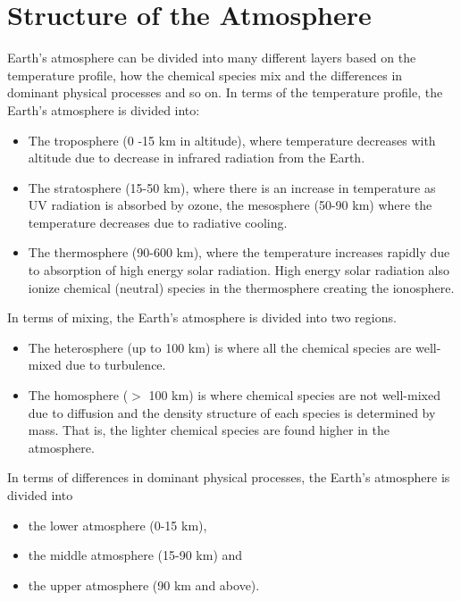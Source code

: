 \section{Structure of the Atmosphere}
\label{sec:str}
Earth’s atmosphere can be divided into many different layers based on the temperature profile, how the chemical species mix and the differences in dominant physical processes and so on. In terms of the temperature profile, the Earth’s atmosphere is divided into: 
\begin{itemize}
	\item The troposphere (0 -15 km in altitude), where temperature decreases with altitude due to decrease in infrared radiation from the Earth. 
	\item The stratosphere (15-50 km), where there is an increase in temperature as UV radiation is absorbed by ozone, the mesosphere (50-90 km) where the temperature decreases due to radiative cooling.
	\item The thermosphere (90-600 km), where the temperature increases rapidly due to absorption of high energy solar radiation.  High energy solar radiation also ionize chemical (neutral) species in the thermosphere creating the ionosphere.
\end{itemize}
In terms of mixing, the Earth’s atmosphere is divided into two regions. 
\begin{itemize}
	\item The heterosphere (up to 100 km) is where all the chemical species are well-mixed due to turbulence. 
	\item The homosphere ($>$ 100 km) is where chemical species are not well-mixed due to diffusion and the density structure of each species is determined by mass. That is, the lighter chemical species are found higher in the atmosphere.  
\end{itemize}
In terms of differences in dominant physical processes, the Earth’s atmosphere is divided into 
\begin{itemize}
	\item the lower atmosphere (0-15 km), 
	\item the middle atmosphere (15-90 km) and 
	\item the upper atmosphere (90 km and above). 
\end{itemize}

